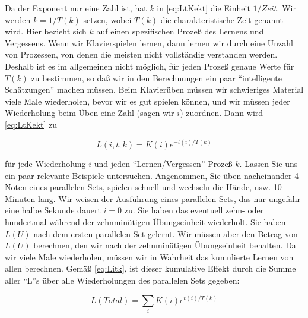 Da der Exponent nur eine Zahl ist, hat $k$ in \autoref{eq:LtKekt} die Einheit $1/Zeit$.
Wir werden $k = 1/T(k)$ setzen, wobei $T(k)$ die charakteristische Zeit genannt wird.
Hier bezieht sich $k$ auf einen spezifischen Prozeß des Lernens und Vergessens.
Wenn wir Klavierspielen lernen, dann lernen wir durch eine Unzahl von Prozessen, von denen die meisten nicht vollständig verstanden werden.
Deshalb ist es im allgemeinen nicht möglich, für jeden Prozeß genaue Werte für $T(k)$ zu bestimmen, so daß wir in den Berechnungen ein paar \enquote{intelligente Schätzungen} machen müssen.
Beim Klavierüben müssen wir schwieriges Material viele Male wiederholen, bevor wir es gut spielen können, und wir müssen jeder Wiederholung beim Üben eine Zahl (sagen wir $i$) zuordnen.
Dann wird \autoref{eq:LtKekt} zu

\begin{equation}
\label{eq:Litk}
 L(i,t,k)=K(i)e^{-t(i)/T(k)}
\end{equation}

für jede Wiederholung $i$ und jeden \enquote{Lernen/Vergessen}-Prozeß $k$.
Lassen Sie uns ein paar relevante Beispiele untersuchen.
Angenommen, Sie üben nacheinander 4 Noten eines parallelen Sets, spielen schnell und wechseln die Hände, usw. 10 Minuten lang.
Wir weisen der Ausführung eines parallelen Sets, das nur ungefähr eine halbe Sekunde dauert $i = 0$ zu.
Sie haben das eventuell zehn- oder hundertmal während der zehnminütigen Übungseinheit wiederholt.
Sie haben $L(U)$ nach dem ersten parallelen Set gelernt.
Wir müssen aber den Betrag von $L(U)$ berechnen, den wir nach der zehnminütigen Übungseinheit behalten.
Da wir viele Male wiederholen, müssen wir in Wahrheit das kumulierte Lernen von allen berechnen.
Gemäß \autoref{eq:Litk}, ist dieser kumulative Effekt durch die Summe aller \enquote{L}s über alle Wiederholungen des parallelen Sets gegeben:

\begin{equation}
\label{eq:sumL}
 L(Total)=\sum_i K(i)e^{t(i)/T(k)}
\end{equation}

